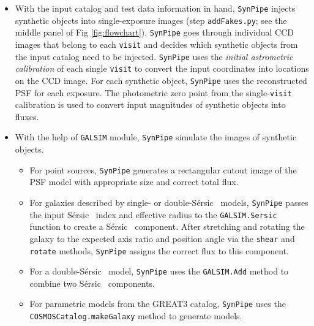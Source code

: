 \documentclass[useamsfonts]{pasj01}
\def\ser{{S\'{e}rsic\ }}
\def\synpipe{\texttt{SynPipe}}
\def\visit{\texttt{visit}}
\def\galsim{\texttt{G}{\scriptsize \texttt{AL}}\texttt{S}{\scriptsize \texttt{IM}}}
\begin{document}
    \begin{itemize}
    
        \item With the input catalog and test data information in hand, \synpipe{} 
            injects synthetic objects into single-exposure images (step
            \texttt{addFakes.py}; see the middle panel of Fig \ref{fig:flowchart}).
            \synpipe{} goes through individual CCD images that belong to 
            each \visit{} and decides which synthetic objects from the input catalog 
            need to be injected. 
            \synpipe{} uses the \textit{initial astrometric calibration} of each 
            single \visit{} to convert the input coordinates into locations on the 
            CCD image. 
            For each synthetic object, \synpipe{} uses the reconstructed PSF for each 
            exposure.  
            The photometric zero point from the single-\visit{} calibration is used
            to convert input magnitudes of synthetic objects into fluxes.
    
        \item With the help of \galsim{} module, \synpipe{} simulate the images of
            synthetic objects.
            \begin{itemize}
            
            \item For point sources, \synpipe{} generates a rectangular cutout image 
                of the PSF model with appropriate size and correct total flux. 
            
            \item For galaxies described by single- or double-\ser{} models, 
                \synpipe{} passes the input \ser{} index and effective radius to 
                the \galsim{}\texttt{.Sersic} function to create a \ser{} component.
                After stretching and rotating the galaxy to the expected axis ratio 
                and position angle via the \texttt{shear} and \texttt{rotate} methods,
                \synpipe{} assigns the correct flux to this component.
            
            \item For a double-\ser{} model, \synpipe{} uses the \galsim{}\texttt{.Add}
                method to combine two \ser{} components. 
            
            \item For parametric models from the GREAT3 catalog, \synpipe{} uses the
                \texttt{COSMOSCatalog.makeGalaxy} method to generate models.  
                

\end{itemize}
\end{itemize}
\end{document}
